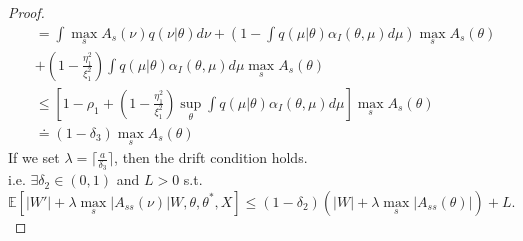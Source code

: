 \begin{proof}
\begin{align*}
&= \int \max_sA_s(\nu) q(\nu | \theta) d\nu + \left(1 -  \int q(\mu | \theta)\alpha_I(\theta, \mu) d\mu\right) \max_sA_s(\theta) \\
& + \left( 1 - \frac{\eta_1^2}{\xi_1^2} \right) \int q(\mu | \theta)\alpha_I(\theta, \mu) d\mu \max_sA_s(\theta)\\
&\leq \left[1 - \rho_1 + \left(1 - \frac{\eta_1^2}{\xi_1^2} \right) \sup_\theta \int q(\mu | \theta)\alpha_I(\theta, \mu) d\mu \right] \max_sA_s(\theta)\\
& \doteq (1 - \delta_3) \max_sA_s(\theta)
\end{align*}
If we set  $\lambda = \lceil\frac{a}{\delta_3} \rceil$, then the drift condition holds.\\
i.e. $\exists \delta_2 \in (0, 1)$ and $L > 0$ s.t. $$\mathbb{E}\left[|W'| + \lambda\max_s|A_{ss}(\nu)  | W, \theta, \theta^*, X\right] \leq (1 - \delta_2)\left(|W| + \lambda \max_s|A_{ss}(\theta)| \right) + L.$$ 
\end{proof}

